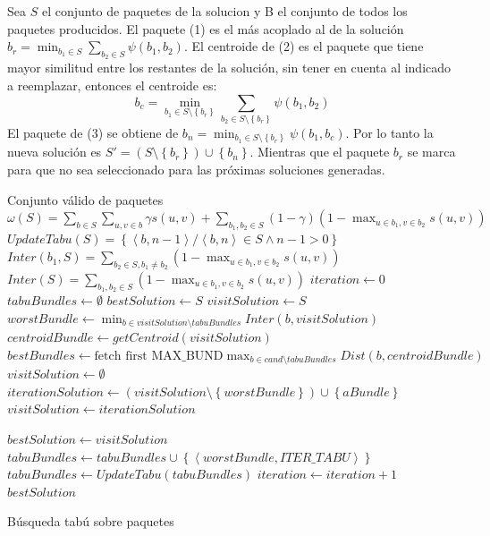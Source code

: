 Sea $S$ el conjunto de paquetes de la solucion y B el conjunto de todos los paquetes producidos. El paquete (1) es el más acoplado al de la solución $b_r = \min_{b_1 \in S}{\sum_{b_2 \in S}{\psi(b_1,b_2)}}$. El centroide de (2) es el paquete que tiene mayor similitud entre los restantes de la solución, sin tener en cuenta al indicado a reemplazar, entonces el centroide es:
$$b_c = \min_{b_1 \in S \setminus \left\{b_r\right\}}{\sum_{b_2 \in S \setminus \left\{b_r\right\}}{\psi(b_1,b_2)}}$$
El paquete de (3) se obtiene de $b_n = \min_{b_1 \in S \setminus \left\{b_r\right\}}{\psi(b_1,b_c)}$. Por lo tanto la nueva solución es $S' = (S \setminus \left\{b_r\right\}) \cup \left\{b_n\right\}$. Mientras que el paquete $b_r$ se marca para que no sea seleccionado para las próximas soluciones generadas.
\begin{algorithm}[H]
\begin{algorithmic}[1]
\ENSURE Conjunto válido de paquetes
\STATE $\omega(S) = \sum_{b \in S}{\sum_{u,v \in b}{\gamma s(u,v)}} + \sum_{b_1,b_2 \in S}{(1-\gamma) (1-\max_{u \in b_1, v \in b_2}{s(u,v)})}$
\STATE $UpdateTabu(S) = \left\{ \left\langle b, n-1 \right\rangle  / \left\langle b, n \right\rangle \in S \wedge n-1 > 0 \right\}$
\STATE $Inter(b_1, S) = \sum_{b_2 \in S, b_1\neq b_2}{(1-\max_{u \in b_1, v \in b_2}{s(u,v)})}$
\STATE $Inter(S) = \sum_{b_1, b_2 \in S}{(1-\max_{u \in b_1, v \in b_2}{s(u,v)})}$
\STATE $iteration \leftarrow 0$
\STATE $tabuBundles \leftarrow \emptyset$
\STATE $bestSolution \leftarrow S$
\STATE $visitSolution \leftarrow S$ 
  \STATE $worstBundle \leftarrow \min_{b \in visitSolution \setminus tabuBundles}{Inter(b, visitSolution)}$
	\STATE $centroidBundle \leftarrow getCentroid(visitSolution)$
	\STATE $bestBundles \leftarrow \text{fetch first MAX\_BUND} \max_{b \in cand \setminus tabuBundles}{Dist(b, centroidBundle)}$
	\STATE $visitSolution \leftarrow \emptyset$
    \STATE $iterationSolution \leftarrow (visitSolution \setminus \left\{worstBundle\right\}) \cup \left\{aBundle\right\}$
			\STATE $visitSolution \leftarrow iterationSolution$
    \ENDIF
  \ENDFOR
	
    \STATE $bestSolution \leftarrow visitSolution$
  \ENDIF
  \STATE $tabuBundles \leftarrow tabuBundles \cup \left\{
	\left\langle worstBundle, ITER\_TABU \right\rangle\right\}$
	\STATE $tabuBundles \leftarrow UpdateTabu(tabuBundles)$
	\STATE $iteration \leftarrow iteration + 1$
\ENDWHILE
\RETURN $bestSolution$
\end{algorithmic}
\caption{Búsqueda tabú sobre paquetes}\label{alg:algBusTabuBundle}
\end{algorithm}

